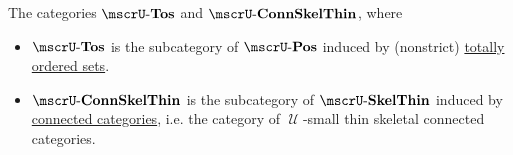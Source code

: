 \begin{theorem}
\begin{thmenum}
     The categories \hyperref[def:totally_ordered_set]{\( \ucat{Tos} \)} and \( \ucat{ConnSkelThin} \), where
    \begin{itemize}
      \item \( \ucat{Tos} \) is the subcategory of \( \ucat{Pos} \) induced by (nonstrict) \hyperref[def:totally_ordered_set]{totally ordered sets}.

      \item \( \ucat{ConnSkelThin} \) is the subcategory of \( \ucat{SkelThin} \) induced by \hyperref[def:connected_category]{connected categories}, i.e. the category of \( \mscrU \)-small thin skeletal connected categories.
    \end{itemize}
  \end{thmenum}
\end{theorem}
